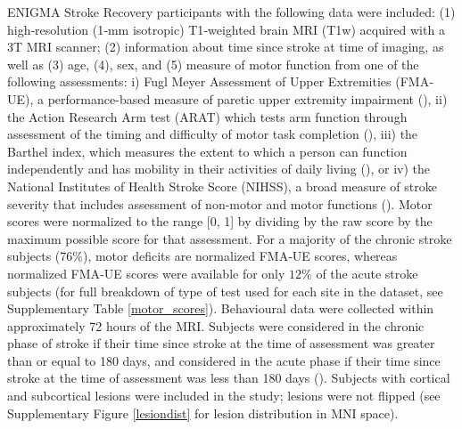\documentclass[10pt]{article}
\begin{document}
ENIGMA Stroke Recovery participants with the following data were included: (1) high‐resolution (1‐mm isotropic) T1‐weighted brain MRI (T1w) acquired with a 3T MRI scanner; (2) information about time since stroke at time of imaging, as well as (3) age, (4), sex, and (5) measure of motor function from one of the following assessments: i) Fugl Meyer Assessment of Upper Extremities (FMA‐UE), a performance-based measure of paretic upper extremity impairment (\cite{Gladstone2002-fw}), ii) the Action Research Arm test (ARAT) which tests arm function through assessment of the timing and difficulty of motor task completion (\cite{Yozbatiran2008-xv}), iii) the Barthel index, which measures the extent to which a person can function independently and has mobility in their activities of daily living (\cite{Sulter1999-rr}), or iv) the National Institutes of Health Stroke Score (NIHSS), a broad measure of stroke severity that includes assessment of non-motor and motor functions (\cite{Lyden2017-za}). Motor scores were normalized to the range [0, 1] by dividing by the raw score by the maximum possible score for that assessment. For a majority of the chronic stroke subjects (76$\%$), motor deficits are normalized FMA‐UE scores, whereas normalized FMA‐UE scores were available for only $12\%$ of the acute stroke subjects (for full breakdown of type of test used for each site in the dataset, see Supplementary Table \ref{motor_scores}). Behavioural data were collected within approximately 72 hours of the MRI. Subjects were considered in the chronic phase of stroke if their time since stroke at the time of assessment was greater than or equal to 180 days, and considered in the acute phase if their time since stroke at the time of assessment was less than 180 days (\cite{Bernhardt2017-av}). Subjects with cortical and subcortical lesions were included in the study; lesions were not flipped (see Supplementary Figure \ref{lesiondist} for lesion distribution in MNI space). 
\end{document}
